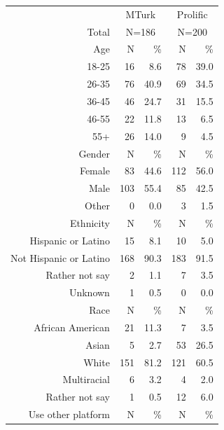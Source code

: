 \documentclass[a4paper,notitlepage,12pt]{article}
\begin{document}
\begin{refsection}[supp]
\begin{table}[!h]
\centering
\small
\setlength{\tabcolsep}{15pt}
\begin{tabular}{ rrrrr }
\toprule
& \multicolumn{2}{c}{MTurk} & \multicolumn{2}{c}{Prolific} \\
\cmidrule(lr){2-3} \cmidrule(lr){4-5}
Total & \multicolumn{2}{c}{N=186} & \multicolumn{2}{c}{N=200} \\
\midrule
Age & N & \% & N & \% \\
\cmidrule(lr){1-5}
18-25   &      16 &   8.6 &       78 &  39.0 \\
26-35   &      76 &  40.9 &       69 &  34.5 \\
36-45   &      46 &  24.7 &       31 &  15.5 \\
46-55   &      22 &  11.8 &       13 &   6.5 \\
55+     &      26 &  14.0 &        9 &   4.5 \\
\midrule
Gender & N & \% & N & \% \\
\cmidrule(lr){1-5}
Female             &    83 &  44.6 &    112 &  56.0 \\
Male               &   103 &  55.4 &     85 &  42.5 \\
Other              &     0 &   0.0 &      3 &   1.5 \\
\midrule
Ethnicity & N & \% & N & \% \\
\cmidrule(lr){1-5}
Hispanic or Latino     &    15 &   8.1 &     10 &   5.0 \\
Not Hispanic or Latino &   168 &  90.3 &    183 &  91.5 \\
Rather not say         &     2 &   1.1 &      7 &   3.5 \\
Unknown                &     1 &   0.5 &      0 &   0.0 \\
\midrule
Race & N & \% & N & \% \\
\cmidrule(lr){1-5}
African American                 &    21 &  11.3 &      7 &   3.5 \\
Asian                                     &     5 &   2.7 &     53 &  26.5 \\
White                                     &   151 &  81.2 &    121 &  60.5 \\
Multiracial                               &     6 &   3.2 &      4 &   2.0 \\
Rather not say                            &     1 &   0.5 &     12 &   6.0 \\
\midrule
Use other platform & N & \% & N & \% \\
\cmidrule(lr){1-5}

\end{tabular}
\end{table}
\end{refsection}
\end{document}
